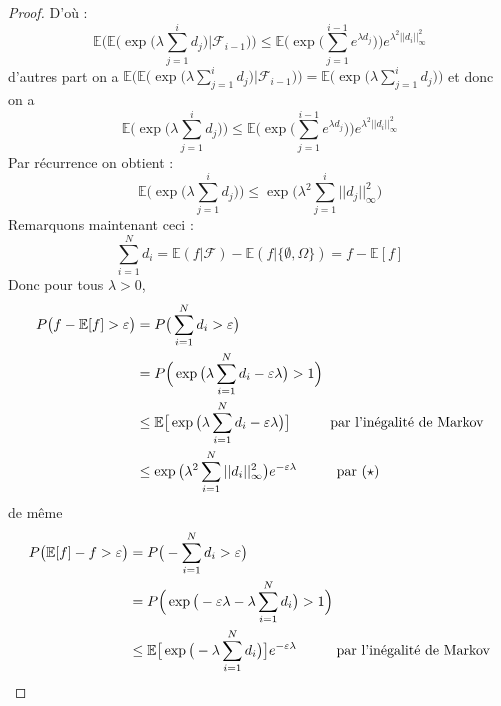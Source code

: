 \documentclass[12pt]{article}
\theoremstyle{definition}
\begin{document}
\begin{proof}
	D'où :
	\begin{equation*}
		\mathbb{E}\Bigg(\mathbb{E}\Big(\exp\big(\lambda\sum_{j=1}^{i}d_j\big)|\mathcal{F}_{i-1}\Big)\Bigg)\leq \mathbb{E}\Bigg(\exp\big(\sum_{j=1}^{i-1}e^{\lambda d_j}\big)\Bigg)e^{\lambda^2 ||d_i||_{\infty}^2}
	\end{equation*}
	d'autres part on a $\mathbb{E}\Bigg(\mathbb{E}\Big(\exp\big(\lambda\sum_{j=1}^{i}d_j\big)|\mathcal{F}_{i-1}\Big)\Bigg)=\mathbb{E}\Big(\exp\big(\lambda\sum_{j=1}^{i}d_j\big)\Big)$
	et donc on a 
	\begin{equation*}
		\mathbb{E}\Big(\exp\big(\lambda\sum_{j=1}^{i}d_j\big)\Big)\leq \mathbb{E}\Bigg(\exp\big(\sum_{j=1}^{i-1}e^{\lambda d_j}\big)\Bigg)e^{\lambda^2 ||d_i||_{\infty}^2}
	\end{equation*}
	Par récurrence on obtient :
	\begin{equation*}\tag{$\star$}
	\mathbb{E}\Big(\exp\big(\lambda\sum_{j=1}^{i}d_j\big)\Big)\leq \exp\big(\lambda^2 \sum_{j=1}^{i}||d_j||_{\infty}^2\big)
	\end{equation*}
	Remarquons maintenant ceci : 
	\begin{equation*}
		\sum_{i=1}^{N}d_i = \mathbb{E}(f|\mathcal{F})-\mathbb{E}(f|\{\emptyset,\Omega\})=f-\mathbb{E}[f]
	\end{equation*}
	Donc pour tous $\lambda>0$,
	\begin{align*}
		P\big(f-\mathbb{E}[f]>\varepsilon\big)&=P\big(\sum_{i=1}^{N}d_i>\varepsilon\big)\\
		&=P\Big(\exp\big(\lambda\sum_{i=1}^{N}d_i-\varepsilon\lambda\big)>1\Big)\\
		&\leq \mathbb{E}\big[\exp\big(\lambda\sum_{i=1}^{N}d_i-\varepsilon\lambda\big)\big] \hspace{10mm} \text{par l'inégalité de Markov}\\
		&\leq \exp\big(\lambda^2 \sum_{i=1}^{N}||d_i||_{\infty}^2\big)e^{-\varepsilon\lambda}\hspace{10mm} \text{par ($\star$)}\\
	\end{align*}
	de même 
	\begin{align*}
		P\big(\mathbb{E}[f]-f>\varepsilon\big)&=P\big(-\sum_{i=1}^{N}d_i>\varepsilon\big)\\
		&=P\Big(\exp\big(-\varepsilon\lambda-\lambda\sum_{i=1}^{N}d_i\big)>1\Big)\\
		&\leq \mathbb{E}\big[\exp\big(-\lambda\sum_{i=1}^{N}d_i\big)\big]e^{-\varepsilon\lambda} \hspace{10mm} \text{par l'inégalité de Markov}\\

\end{align*}
\end{proof}
\end{document}
